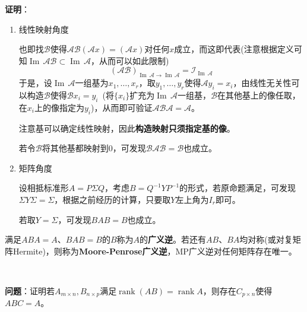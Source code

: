 \documentclass[a4paper,UTF8,fontset=windows]{ctexart}
\DeclareMathOperator{\rank}{rank}
\DeclareMathOperator{\im}{Im\,}
\newcommand*{\ma}{\mathcal{A}}
\newcommand*{\mb}{\mathcal{B}}
\newcommand*{\mi}{\mathcal{I}}
\newcommand*{\note}{\noindent *}
\begin{document}
\textbf{证明}：
\begin{enumerate}
    \item 线性映射角度
    
    也即找$\mb$使得$\ma\mb(\ma x)=(\ma x)$对任何$x$成立，而这即代表(注意根据定义可知$\im\ma\mb\subset\im\ma$，从而可以如此限制)
    $$(\ma\mb)_{\im\ma\to\im\ma}=\mi_{\im\ma}$$
    于是，设$\im\ma$一组基为$x_1,\dots,x_r$，取$y_1,\dots,y_r$使得$\ma y_i=x_i$，由线性无关性可以构造$\mb$使得$\mb x_i=y_i$\ (将$\{x_i\}$扩充为$\im\ma$一组基，$\mb$在其他基上的像任取，在$x_i$上的像指定为$y_i$)，从而即可验证$\ma\mb\ma=\ma$。

    \note 注意基可以确定线性映射，因此\textbf{构造映射只须指定基的像}。

    \note 若令$\mb$将其他基都映射到0，可发现$\mb\ma\mb=\mb$也成立。

    \item 矩阵角度

    设相抵标准形$A=P\Sigma Q$，考虑$B=Q^{-1}YP^{-1}$的形式，若原命题满足，可发现$\Sigma Y\Sigma=\Sigma$，根据之前经历的计算，只要取$Y$左上角为$I_r$即可。

    \note 若取$Y=\Sigma$，可发现$BAB=B$也成立。
\end{enumerate}

\note 满足$ABA=A$、$BAB=B$的$B$称为$A$的\textbf{广义逆}。若还有$AB$、$BA$均对称(或对复矩阵Hermite)，则称为\textbf{Moore-Penrose广义逆}，MP广义逆对任何矩阵存在唯一。

\

\textbf{问题}：证明若$A_{m\times n},B_{n\times p}$满足$\rank(AB)=\rank A$，则存在$C_{p\times n}$使得$ABC=A$。
\end{document}
